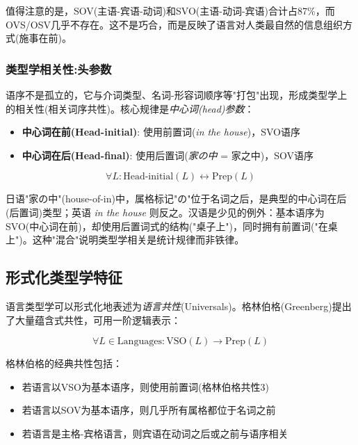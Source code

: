 值得注意的是，SOV(主语-宾语-动词)和SVO(主语-动词-宾语)合计占87\%，而OVS/OSV几乎不存在。这不是巧合，而是反映了语言对人类最自然的信息组织方式(施事在前)。

\subsubsection{类型学相关性:头参数}

语序不是孤立的，它与介词类型、名词-形容词顺序等"打包"出现，形成类型学上的相关性(相关词序共性)。核心规律是\emph{中心词(head)参数}：
\begin{itemize}
    \item \textbf{中心词在前(Head-initial)}: 使用前置词(\textit{in the house})，SVO语序
    \item \textbf{中心词在后(Head-final)}: 使用后置词(\textit{家の中} = 家之中)，SOV语序
\end{itemize}

\begin{equation}
    \forall L: \text{Head-initial}(L) \leftrightarrow \text{Prep}(L)
\end{equation}

日语"家の中"(house-of-in)中，属格标记"の"位于名词之后，是典型的中心词在后(后置词)类型；英语 \textit{in the house} 则反之。汉语是少见的例外：基本语序为SVO(中心词在前)，却使用后置词式的结构("桌子上")，同时拥有前置词("在桌上")。这种"混合"说明类型学相关是统计规律而非铁律。

\subsection{形式化类型学特征}

语言类型学可以形式化地表述为\emph{语言共性}(Universals)。格林伯格(Greenberg)提出了大量蕴含式共性，可用一阶逻辑表示：

\begin{equation}
    \forall L \in \text{Languages}: \text{VSO}(L) \rightarrow \text{Prep}(L)
\end{equation}

格林伯格的经典共性包括：
\begin{itemize}
    \item 若语言以VSO为基本语序，则使用前置词(格林伯格共性3)
    \item 若语言以SOV为基本语序，则几乎所有属格都位于名词之前
    \item 若语言是主格-宾格语言，则宾语在动词之后或之前与语序相关
\end{itemize}

